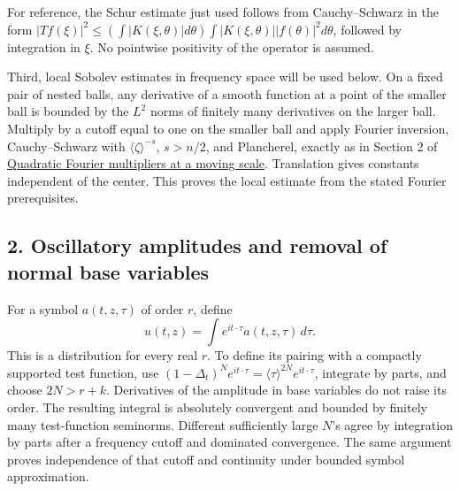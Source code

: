 \documentclass[
  11pt,
]{article}
\makeatletter
\let\ReaderOriginalAnchorStart\hyper@anchorstart
\let\ReaderOriginalAnchorEnd\hyper@anchorend
\let\ReaderPendingAliases\@empty
\def\ReaderArmAliases#1{\gdef\ReaderPendingAliases{#1}}
\def\hyper@anchorstart#1{\ReaderIfNativeAnchorTF{#1}{\ReaderPendingAliases\global\let\ReaderPendingAliases\@empty}{}\ReaderOriginalAnchorStart{#1}}
\makeatother
\begin{document}
For reference, the Schur estimate just used follows from Cauchy--Schwarz
in the form \(|Tf(\xi)|^2\leq (\int|K(\xi,\theta)|d\theta)
\int|K(\xi,\theta)||f(\theta)|^2d\theta\), followed by integration in
\(\xi\). No pointwise positivity of the operator is assumed.

Third, local Sobolev estimates in frequency space will be used below. On
a fixed pair of nested balls, any derivative of a smooth function at a
point of the smaller ball is bounded by the \(L^2\) norms of finitely
many derivatives on the larger ball. Multiply by a cutoff equal to one
on the smaller ball and apply Fourier inversion, Cauchy--Schwarz with
\(\langle\zeta\rangle^{-s}\), \(s>n/2\), and Plancherel, exactly as in
Section 2 of \href{gauss-transform-estimates.pdf}{Quadratic Fourier
multipliers at a moving scale}. Translation gives constants independent
of the center. This proves the local estimate from the stated Fourier
prerequisites.

\ReaderArmAliases{\ReaderOriginalAnchorStart{AN03-CN-002}\ReaderOriginalAnchorEnd\begingroup\expandafter\def\csname @currentHref\endcsname{AN03-CN-002}\label{AN03-CN-002}\endgroup\ReaderOriginalAnchorStart{an03-cn-002-oscillatory-amplitudes-and-removal-of-normal-base-variables}\ReaderOriginalAnchorEnd\begingroup\expandafter\def\csname @currentHref\endcsname{an03-cn-002-oscillatory-amplitudes-and-removal-of-normal-base-variables}\label{an03-cn-002-oscillatory-amplitudes-and-removal-of-normal-base-variables}\endgroup\ReaderOriginalAnchorStart{2-oscillatory-amplitudes-and-removal-of-normal-base-variables}\ReaderOriginalAnchorEnd\begingroup\expandafter\def\csname @currentHref\endcsname{2-oscillatory-amplitudes-and-removal-of-normal-base-variables}\label{2-oscillatory-amplitudes-and-removal-of-normal-base-variables}\endgroup\ReaderOriginalAnchorStart{oscillatory-amplitudes-and-removal-of-normal-base-variables}\ReaderOriginalAnchorEnd}
\subsection{2. Oscillatory amplitudes and removal of normal base
variables}\label{oscillatory-amplitudes-and-removal-of-normal-base-variables}

For a symbol \(a(t,z,\tau)\) of order \(r\), define \[
u(t,z)=\int e^{it\cdot\tau}a(t,z,\tau)\,d\tau.
\tag{C4}
\] This is a distribution for every real \(r\). To define its pairing
with a compactly supported test function, use
\((1-\Delta_t)^N e^{it\cdot\tau}=\langle\tau\rangle^{2N}e^{it\cdot\tau}\),
integrate by parts, and choose \(2N>r+k\). Derivatives of the amplitude
in base variables do not raise its order. The resulting integral is
absolutely convergent and bounded by finitely many test-function
seminorms. Different sufficiently large \(N\)'s agree by integration by
parts after a frequency cutoff and dominated convergence. The same
argument proves independence of that cutoff and continuity under bounded
symbol approximation.
\end{document}
